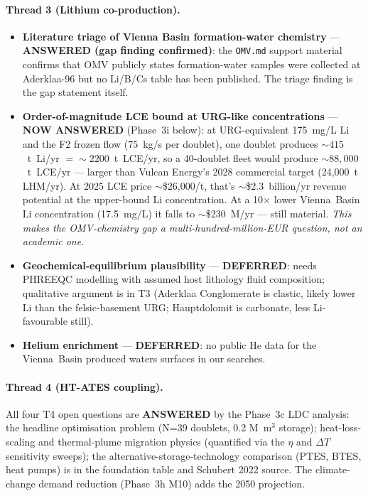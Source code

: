 \documentclass{article}
\begin{document}
\paragraph{Thread 3 (Lithium co-production).}
\begin{itemize}
\item \textbf{Literature triage of Vienna Basin formation-water
chemistry} --- \textbf{ANSWERED (gap finding confirmed)}: the
\texttt{OMV.md} support material confirms that OMV publicly states
formation-water samples were collected at Aderklaa-96 but no Li/B/Cs
table has been published. The triage finding is the gap statement
itself.
\item \textbf{Order-of-magnitude LCE bound at URG-like
concentrations} --- \textbf{NOW ANSWERED} (Phase~3i below): at
URG-equivalent 175~mg/L Li and the F2 frozen flow ($75$~kg/s per
doublet), one doublet produces $\sim 415$~t~Li/yr
$= \sim 2200$~t~LCE/yr, so a 40-doublet fleet would produce
$\sim 88{,}000$~t~LCE/yr --- larger than Vulcan Energy's 2028
commercial target (24{,}000~t LHM/yr). At 2025 LCE price
$\sim$\$26{,}000/t, that's $\sim$\$2.3~billion/yr revenue potential
at the upper-bound Li concentration. At a 10$\times$ lower Vienna~Basin Li
concentration (17.5~mg/L) it falls to $\sim$\$230~M/yr ---
still material. \emph{This makes the OMV-chemistry gap a
multi-hundred-million-EUR question, not an academic one.}
\item \textbf{Geochemical-equilibrium plausibility} --- \textbf{DEFERRED}:
needs PHREEQC modelling with assumed host lithology fluid composition;
qualitative argument is in T3 (Aderklaa Conglomerate is clastic,
likely lower Li than the felsic-basement URG; Hauptdolomit is
carbonate, less Li-favourable still).
\item \textbf{Helium enrichment} --- \textbf{DEFERRED}: no public
He data for the Vienna~Basin produced waters surfaces in our
searches.
\end{itemize}

\paragraph{Thread 4 (HT-ATES coupling).}
All four T4 open questions are \textbf{ANSWERED} by the Phase~3c LDC
analysis: the headline optimisation problem (N=39 doublets, 0.2 M~m$^3$
storage); heat-loss-scaling and thermal-plume migration physics
(quantified via the $\eta$ and $\Delta T$ sensitivity sweeps); the
alternative-storage-technology comparison (PTES, BTES, heat pumps)
is in the foundation table and Schubert 2022 source. The climate-change
demand reduction (Phase~3h M10) adds the 2050 projection.
\end{document}
